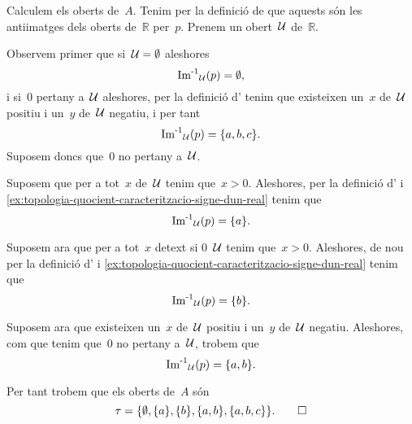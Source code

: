 \documentclass[../topologia.tex]{subfiles}
\begin{document}
    \begin{solution}
        Calculem els oberts de~\(A\).
        Tenim per la definició de  que aquests són les antiimatges dels oberts de~\(\mathbb{R}\) per~\(p\).
        Prenem un obert~\(\mathcal{U}\) de~\(\mathbb{R}\).

        Observem primer que si~\(\mathcal{U}=\emptyset\) aleshores
        \[
            \operatorname{\operatorname{Im}^{-1}}_{\mathcal{U}}(p)=\emptyset,
        \]
        i si~\(0\) pertany a~\(\mathcal{U}\) aleshores, per la definició d' tenim que existeixen un~\(x\) de~\(\mathcal{U}\) positiu i un~\(y\) de~\(\mathcal{U}\) negatiu, i per tant
        \[
            \operatorname{\operatorname{Im}^{-1}}_{\mathcal{U}}(p)=\{a,b,c\}.
        \]
        Suposem doncs que~\(0\) no pertany a~\(\mathcal{U}\).

        Suposem que per a tot~\(x\) de~\(\mathcal{U}\) tenim que~\(x>0\).
        Aleshores, per la definició d' i \eqref{ex:topologia-quocient-caracteritzacio-signe-dun-real} tenim que
        \[
            \operatorname{\operatorname{Im}^{-1}}_{\mathcal{U}}(p)=\{a\}.
        \]

        Suposem ara que per a tot~\(x\) detext{ si }0~\(\mathcal{U}\) tenim que~\(x>0\).
        Aleshores, de nou per la definició d' i \eqref{ex:topologia-quocient-caracteritzacio-signe-dun-real} tenim que
        \[
            \operatorname{\operatorname{Im}^{-1}}_{\mathcal{U}}(p)=\{b\}.
        \]

        Suposem ara que existeixen un~\(x\) de~\(\mathcal{U}\) positiu i un~\(y\) de~\(\mathcal{U}\) negatiu.
        Aleshores, com que tenim que~\(0\) no pertany a~\(\mathcal{U}\), trobem que
        \[
            \operatorname{\operatorname{Im}^{-1}}_{\mathcal{U}}(p)=\{a,b\}.
        \]

        Per tant trobem que els oberts de~\(A\) són
        \[
            \tau=\{\emptyset,\{a\},\{b\},\{a,b\},\{a,b,c\}\}.\qedhere
        \]
    \end{solution}
\end{document}
